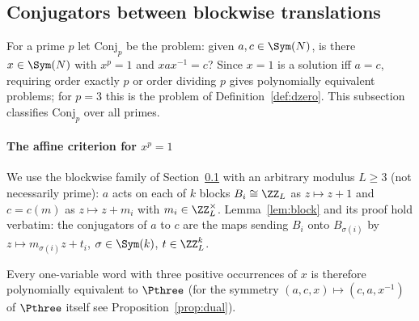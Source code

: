\begin{thm}
\begin{defi}
\subsection{Conjugators between blockwise translations}\label{sec:block}
For a prime $p$ let $\mathrm{Conj}_p$ be the problem: given $a,c\in\Sym(N)$, is there $x\in\Sym(N)$ with $x^{p}=1$ and $xax^{-1}=c$?
Since $x=1$ is a solution iff $a=c$, requiring order exactly $p$ or order dividing $p$ gives polynomially equivalent problems; for $p=3$ this
is the problem of Definition~\ref{def:dzero}. This subsection classifies $\mathrm{Conj}_p$ over all primes.

\paragraph{The affine criterion for $x^{p}=1$}
We use the blockwise family of Section~\ref{sec:block} with an arbitrary modulus $L\ge3$ (not necessarily prime): $a$ acts on each of $k$
blocks $B_i\cong\ZZ_L$ as $z\mapsto z+1$ and $c=c(m)$ as $z\mapsto z+m_i$ with $m_i\in\ZZ_L^{\times}$. Lemma~\ref{lem:block} and its proof
hold verbatim: the conjugators of $a$ to $c$ are the maps sending $B_i$ onto $B_{\sigma(i)}$ by $z\mapsto m_{\sigma(i)}z+t_i$,
$\sigma\in\Sym(k)$, $t\in\ZZ_L^{k}$.

Every one-variable word with three positive occurrences of $x$ is therefore polynomially equivalent to $\Pthree$ (for the symmetry
$(a,c,x)\mapsto(c,a,x^{-1})$ of $\Pthree$ itself see Proposition~\ref{prop:dual}).


\end{defi}
\end{thm}
